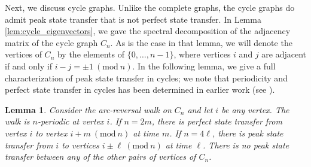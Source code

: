\documentclass{article}
\newtheorem{lemma}[theorem]{Lemma}
\numberwithin{equation}{section}
\newcommand{\slimmod}[1]{\ (\mathrm{mod}\ #1)}
\begin{document}
Next, we discuss cycle graphs. Unlike the complete graphs, the cycle graphs do admit peak state transfer that is not perfect state transfer. In Lemma \ref{lem:cycle_eigenvectors}, we gave the spectral decomposition of the adjacency matrix of the cycle graph $C_n$. As is the case in that lemma, we will denote the vertices of $C_n$ by the elements of $\{0,\ldots,n-1\}$, where vertices $i$ and $j$ are adjacent if and only if $i - j = \pm 1 \slimmod n$. In the following lemma, we give a full characterization of peak state transfer in cycles; we note that periodicity and perfect state transfer in cycles has been determined in earlier work (see \cite{YalGed2015}).


\begin{lemma}
\label{lem:cycles_peakST}
Consider the arc-reversal walk on $C_n$ and let $i$ be any vertex. The walk is $n$-periodic at vertex $i$. If $n = 2m$, there is perfect state transfer from vertex $i$ to vertex $i + m \slimmod n$ at time $m$. If $n = 4\ell$, there is peak state transfer from $i$ to vertices $i \pm \ell \slimmod n$ at time $\ell$. There is no peak state transfer between any of the other pairs of vertices of $C_n$.
\end{lemma}
\end{document}
